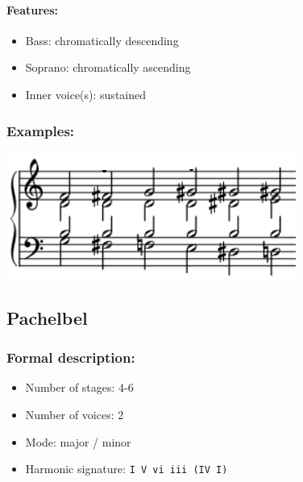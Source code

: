 \documentclass[11pt, openany]{article}
\begin{document}
\paragraph{Features:}
\begin{itemize}
\item Bass: chromatically descending
\item Soprano: chromatically ascending
\item Inner voice(s): sustained
\end{itemize}

\subsubsection{Examples:}
\begin{center}
\includegraphics[scale=1]{omnibus.png}
\end{center}


	\subsection{Pachelbel}
	
\subsubsection{Formal description:}
\begin{itemize}
\item Number of stages: 4-6
\item Number of voices: 2
\item Mode: major / minor
\item Harmonic signature: \texttt{I V vi iii (IV I)}
\end{itemize}
\end{document}
